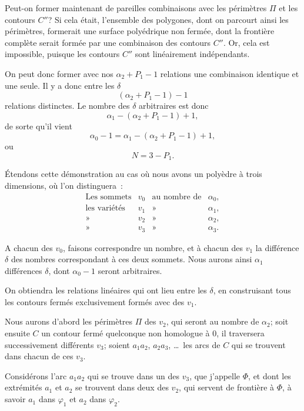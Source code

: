 \documentclass{article}
\begin{document}
Peut-on former maintenant de pareilles combinaisons avec les périmètres $\Pi$ et les contours $C''$? Si cela était, l'ensemble des polygones, dont on parcourt ainsi les périmètres, formerait une surface polyédrique non fermée, dont la frontière complète serait formée par une combinaison des contours $C''$. Or, cela est impossible, puisque les contours $C''$ sont linéairement indépendants.

On peut donc former avec nos $\alpha_{2} + P_{1} - 1$ relations une combinaison identique et une seule. Il y a donc entre les $\delta$
\[ (\alpha_{2} + P_{1} - 1) - 1 \]
relations distinctes. Le nombre des $\delta$ arbitraires est donc
\[ \alpha_{1} - (\alpha_{2} + P_{1} - 1) + 1, \]
de sorte qu'il vient
\[ \alpha_{0} - 1 = \alpha_{1} - (\alpha_{2} + P_{1} - 1) + 1, \]
ou
\[ N = 3 - P_{1}. \]

Étendons cette démonstration au cas où nous avons un polyèdre à trois dimensions, où l'on distinguera~:
\[ \begin{matrix} \text{Les sommets} & v_{0} & \text{au nombre de} & \alpha_{0}, \\[1ex] \text{les variétés} & v_{1} & \text{»} & \alpha_{1}, \\[1ex] \text{»} & v_{2} & \text{»} & \alpha_{2}, \\[1ex] \text{»} & v_{3} & \text{»} & \alpha_{3}. \end{matrix} \]

A chacun des $v_{0}$, faisons correspondre un nombre, et à chacun des $v_{1}$ la différence $\delta$ des nombres correspondant à ces deux sommets. Nous aurons ainsi $\alpha_{1}$ différences $\delta$, dont $\alpha_{0} - 1$ seront arbitraires.

On obtiendra les relations linéaires qui ont lieu entre les $\delta$, en construisant tous les contours fermés exclusivement formés avec des $v_{1}$.

Nous aurons d'abord les périmètres $\Pi$ des $v_{2}$, qui seront au nombre de $\alpha_{2}$; soit ensuite $C$ un contour fermé quelconque non homologue à 0, il traversera successivement différents $v_{3}$; soient $a_{1}a_{2}$, $a_{2}a_{3}$, \ldots\ les arcs de $C$ qui se trouvent dans chacun de ces $v_{3}$.

Considérons l'arc $a_{1}a_{2}$ qui se trouve dans un des $v_{3}$, que j'appelle $\Phi$, et dont les extrémités $a_{1}$ et $a_{2}$ se trouvent dans deux des $v_{2}$, qui servent de frontière à $\Phi$, à savoir $a_{1}$ dans $\varphi_{1}$ et $a_{2}$ dans $\varphi_{2}$.
\end{document}
